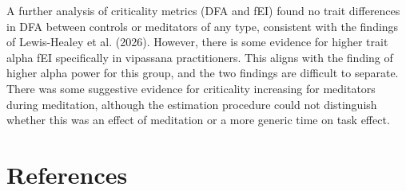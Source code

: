 \documentclass[10pt,a4paper]{article}
\begin{document}
A further analysis of criticality metrics (DFA and fEI) found no trait differences in DFA between
controls or meditators of any type, consistent with the findings of Lewis-Healey et al. (2026).
However, there is some evidence for higher trait alpha fEI specifically in vipassana practitioners. 
This aligns with the finding of higher alpha power for this group, and the two findings are difficult to separate.
There was some suggestive evidence for criticality increasing for meditators during meditation, 
although the estimation procedure could not distinguish whether this was an effect of meditation
or a more generic time on task effect.




\clearpage

\section*{References}
\begingroup
\small
\end{document}
